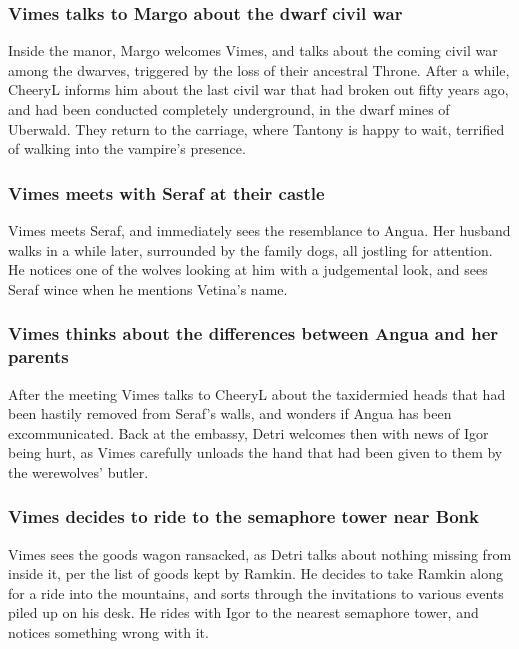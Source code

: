 \subsubsection{\Gls{Vimes} talks to \Gls{Margo} about the dwarf civil war}
Inside the manor, \Gls{Margo} welcomes \Gls{Vimes}, and talks about the coming civil war among the
dwarves, triggered by the loss of their ancestral Throne. After a while, \Gls{CheeryL} informs him
about the last civil war that had broken out fifty years ago, and had been conducted completely
underground, in the dwarf mines of Uberwald. They return to the carriage, where \Gls{Tantony} is
happy to wait, terrified of walking into the vampire's presence.

\subsubsection{\Gls{Vimes} meets with \Gls{Seraf} at their castle}
\Gls{Vimes} meets \Gls{Seraf}, and immediately sees the resemblance to \Gls{Angua}. Her husband
walks in a while later, surrounded by the family dogs, all jostling for attention. He notices one of
the wolves looking at him with a judgemental look, and sees \Gls{Seraf} wince when he mentions
\Gls{Vetina}'s name.

\subsubsection{\Gls{Vimes} thinks about the differences between \Gls{Angua} and her parents}
After the meeting \Gls{Vimes} talks to \Gls{CheeryL} about the taxidermied heads that had been
hastily removed from \Gls{Seraf}'s walls, and wonders if \Gls{Angua} has been excommunicated.
Back at the embassy, \Gls{Detri} welcomes then with news of \Gls{Igor} being hurt, as \Gls{Vimes}
carefully unloads the hand that had been given to them by the werewolves' butler.

\subsubsection{\Gls{Vimes} decides to ride to the semaphore tower near Bonk}
\Gls{Vimes} sees the goods wagon ransacked, as \Gls{Detri} talks about nothing missing from inside
it, per the list of goods kept by \Gls{Ramkin}. He decides to take \Gls{Ramkin} along for a ride
into the mountains, and sorts through the invitations to various events piled up on his desk. He
rides with \Gls{Igor} to the nearest semaphore tower, and notices something wrong with it.

